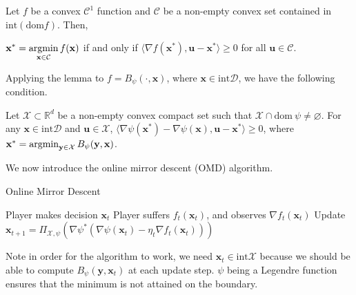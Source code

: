 \documentclass[12pt, a4paper]{report}
\begin{document}
\begin{lem}
Let $f$ be a convex $\mathcal{C}^1$ function and $\mathcal{C}$ be a non-empty convex set contained in $\mathrm{int} (\mathrm{dom} f)$. Then, 
\begin{center}
    $\displaystyle \mathbf{x}^{*} = \operatorname*{argmin}_{\mathbf{x} \in \mathcal{C}} f(\mathbf{x})$ if and only if $\langle \nabla f(\mathbf{x}^*), \mathbf{u} - \mathbf{x}^* \rangle \geq 0$ for all $\mathbf{u} \in \mathcal{C}$.
\end{center}
\end{lem}
Applying the lemma to $f = B_\psi(\cdot, \mathbf{x})$, where $\mathbf{x} \in \mathrm{int} \mathcal{D}$, we have the following condition.
\begin{prop} \label{prop:optimal}
Let $\mathcal{X} \subset \mathbb{R}^d$ be a non-empty convex compact set such that $\mathcal{X} \cap \mathrm{dom}\ \psi \neq \varnothing$.
For any $\mathbf{x} \in \mathrm{int} \mathcal{D}$ and $\mathbf{u} \in \mathcal{X}$, $\langle \nabla \psi(\mathbf{x}^{*}) - \nabla \psi(\mathbf{x}), \mathbf{u} - \mathbf{x^{*}} \rangle \geq 0$, where $\mathbf{x}^* = \operatorname*{argmin}_{\mathbf{y} \in \mathcal{X}} B_\psi(\mathbf{y}, \mathbf{x})$.
\end{prop}
We now introduce the online mirror descent (OMD) algorithm. 
\begin{algorithm} 
\caption{Online Mirror Descent} \label{alg:omd}
\begin{algorithmic}[1]
\State Player makes decision $\mathbf{x}_t$
\State Player suffers $f_t(\mathbf{x}_t)$, and observes $\nabla f_t(\mathbf{x}_t)$
\State Update $ \mathbf{x}_{t+1} = \Pi_{\mathcal{X}, \psi}(\nabla \psi^{*}(\nabla \psi(\mathbf{x}_t) - \eta_t \nabla f_t(\mathbf{x}_t)))$
\EndFor
\end{algorithmic}
\end{algorithm}
\begin{rem}
Note in order for the algorithm to work, we need $\mathbf{x}_{t} \in \mathrm{int} \mathcal{X}$ because we should be able to compute $B_\psi(\mathbf{y}, \mathbf{x}_t)$ at each update step. $\psi$ being a Legendre function ensures that the minimum is not attained on the boundary.
\end{rem}
\end{document}

